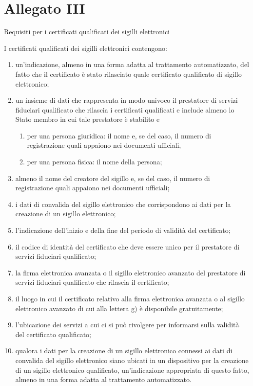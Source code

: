 \section{Allegato III}\label{sec:allegatoIIIreg9102014}
Requisiti per i certificati qualificati dei sigilli elettronici\par 
I certificati qualificati dei sigilli elettronici contengono:
\begin{enumerate}
	\item un’indicazione, almeno in una forma adatta al trattamento automatizzato, del fatto che il certificato è stato rilasciato quale certificato qualificato di sigillo elettronico;
	\item 	
	un insieme di dati che rappresenta in modo univoco il prestatore di servizi fiduciari qualificato che rilascia i certificati qualificati e include almeno lo Stato membro in cui tale prestatore è stabilito e
	\begin{enumerate}
		\item per una persona giuridica: il nome e, se del caso, il numero di registrazione quali appaiono nei documenti ufficiali,
		\item per una persona fisica: il nome della persona;
	\end{enumerate}
\item almeno il nome del creatore del sigillo e, se del caso, il numero di registrazione quali appaiono nei documenti ufficiali;
\item 	
i dati di convalida del sigillo elettronico che corrispondono ai dati per la creazione di un sigillo elettronico;
\item l’indicazione dell’inizio e della fine del periodo di validità del certificato;
\item il codice di identità del certificato che deve essere unico per il prestatore di servizi fiduciari qualificato;
\item la firma elettronica avanzata o il sigillo elettronico avanzato del prestatore di servizi fiduciari qualificato che rilascia il certificato;
\item 	
il luogo in cui il certificato relativo alla firma elettronica avanzata o al sigillo elettronico avanzato di cui alla lettera g) è disponibile gratuitamente;
\item 	
l’ubicazione dei servizi a cui ci si può rivolgere per informarsi sulla validità del certificato qualificato;
\item qualora i dati per la creazione di un sigillo elettronico connessi ai dati di convalida del sigillo elettronico siano ubicati in un dispositivo per la creazione di un sigillo elettronico qualificato, un’indicazione appropriata di questo fatto, almeno in una forma adatta al trattamento automatizzato.
\end{enumerate}
